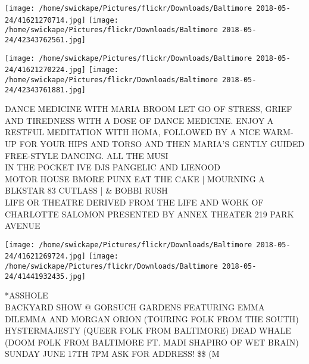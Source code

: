 \documentclass[10pt,letterpaper]{article}
\begin{document}
\texttt{[image: /home/swickape/Pictures/flickr/Downloads/Baltimore 2018-05-24/41621270714.jpg]}
\texttt{[image: /home/swickape/Pictures/flickr/Downloads/Baltimore 2018-05-24/42343762561.jpg]}

\texttt{[image: /home/swickape/Pictures/flickr/Downloads/Baltimore 2018-05-24/41621270224.jpg]}
\texttt{[image: /home/swickape/Pictures/flickr/Downloads/Baltimore 2018-05-24/42343761881.jpg]}

DANCE MEDICINE WITH MARIA BROOM LET GO OF STRESS, GRIEF AND TIREDNESS WITH A DOSE OF DANCE MEDICINE.  ENJOY A RESTFUL MEDITATION WITH HOMA, FOLLOWED BY A NICE WARM{-}UP FOR YOUR HIPS AND TORSO AND THEN MARIA'S GENTLY GUIDED FREE{-}STYLE DANCING.  ALL THE MUSI\\
IN THE POCKET IVE DJS PANGELIC AND LIENOOD\\
MOTOR HOUSE BMORE PUNX EAT THE CAKE | MOURNING A BLKSTAR 83 CUTLASS |  \& BOBBI RUSH\\
LIFE OR THEATRE DERIVED FROM THE LIFE AND WORK OF CHARLOTTE SALOMON PRESENTED BY ANNEX THEATER 219 PARK AVENUE
\pagebreak

\texttt{[image: /home/swickape/Pictures/flickr/Downloads/Baltimore 2018-05-24/41621269724.jpg]}
\texttt{[image: /home/swickape/Pictures/flickr/Downloads/Baltimore 2018-05-24/41441932435.jpg]}

*ASSHOLE\\
BACKYARD SHOW @ GORSUCH GARDENS FEATURING EMMA DILEMMA AND MORGAN ORION (TOURING FOLK FROM THE SOUTH) HYSTERMAJESTY (QUEER FOLK FROM BALTIMORE) DEAD WHALE (DOOM FOLK FROM BALTIMORE FT. MADI SHAPIRO OF WET BRAIN) SUNDAY JUNE 17TH 7PM ASK FOR ADDRESS! \$\$ (M
\pagebreak
\end{document}
